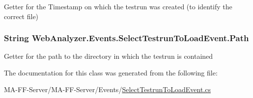 Getter for the Timestamp on which the testrun was created (to identify the correct file) 

\hypertarget{class_web_analyzer_1_1_events_1_1_select_testrun_to_load_event_aa27c59c738823f2dce810a0b8f89259d}{}
\subsubsection[{Path}]{\setlength{\rightskip}{0pt plus 5cm}String Web\+Analyzer.\+Events.\+Select\+Testrun\+To\+Load\+Event.\+Path\hspace{0.3cm}{\ttfamily [get]}}\label{class_web_analyzer_1_1_events_1_1_select_testrun_to_load_event_aa27c59c738823f2dce810a0b8f89259d}


Getter for the path to the directory in which the testrun is contained 



The documentation for this class was generated from the following file\+:\begin{DoxyCompactItemize}
\item 
M\+A-\/\+F\+F-\/\+Server/\+M\+A-\/\+F\+F-\/\+Server/\+Events/\hyperlink{_select_testrun_to_load_event_8cs}{Select\+Testrun\+To\+Load\+Event.\+cs}\end{DoxyCompactItemize}

